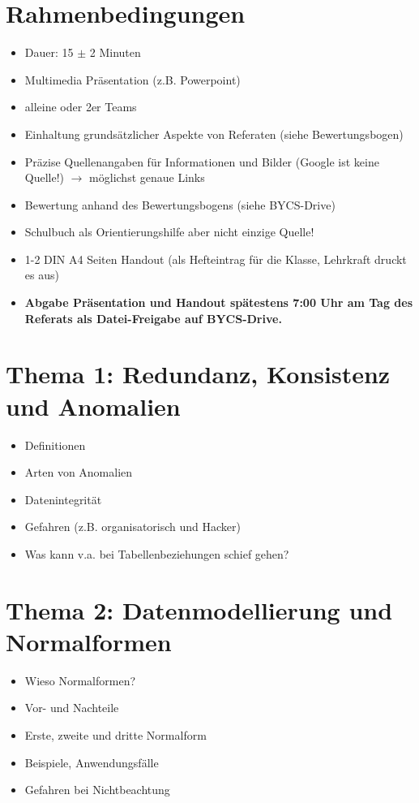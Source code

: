 
\section*{Rahmenbedingungen}
\begin{itemize}
    \item Dauer: 15 $\pm$ 2 Minuten 
    \item Multimedia Präsentation (z.B. Powerpoint)
    \item alleine oder 2er Teams
    \item Einhaltung grundsätzlicher Aspekte von Referaten (siehe Bewertungsbogen)
    \item Präzise Quellenangaben für Informationen und Bilder (Google ist keine Quelle!) $\rightarrow$ möglichst genaue Links
    \item Bewertung anhand des Bewertungsbogens (siehe BYCS-Drive)
    \item Schulbuch als Orientierungshilfe aber nicht einzige Quelle!
    \item 1-2 DIN A4 Seiten Handout (als Hefteintrag für die Klasse, Lehrkraft druckt es aus)
    \item \textbf{Abgabe Präsentation und Handout spätestens 7:00 Uhr am Tag des Referats als Datei-Freigabe auf BYCS-Drive.}
\end{itemize}

\section*{Thema 1: Redundanz, Konsistenz und Anomalien}
\begin{itemize}
    \item Definitionen
    \item Arten von Anomalien
    \item Datenintegrität
    \item Gefahren (z.B. organisatorisch und Hacker)
    \item Was kann v.a. bei Tabellenbeziehungen schief gehen?
\end{itemize}

\section*{Thema 2: Datenmodellierung und Normalformen}
\begin{itemize}
    \item Wieso Normalformen? 
    \item Vor- und Nachteile
    \item Erste, zweite und dritte Normalform
    \item Beispiele, Anwendungsfälle
    \item Gefahren bei Nichtbeachtung
\end{itemize}